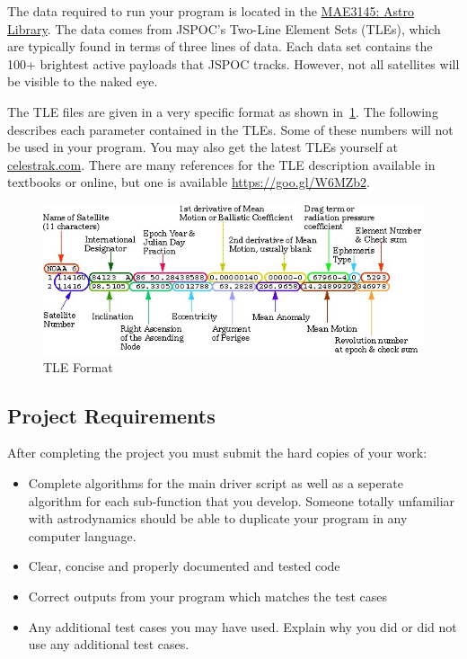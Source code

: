 \documentclass[11pt, reqno]{article}    %
\begin{document}
The data required to run your program is located in the \href{https://github.com/fdcl-gwu/MAE3145_library}{MAE3145: Astro Library}.
The data comes from JSPOC's Two-Line Element Sets (TLEs), which are typically found in terms of three lines of data.
Each data set contains the 100+ brightest active payloads that JSPOC tracks.
However, not all satellites will be visible to the naked eye.

The TLE files are given in a very specific format as shown in~\cref{fig:tle}. 
The following describes each parameter contained in the TLEs.
Some of these numbers will not be used in your program. 
You may also get the latest TLEs yourself at \href{www.clestrak.com}{celestrak.com}.
There are many references for the TLE description available in textbooks or online, but one is available \href{https://goo.gl/W6MZb2}{https://goo.gl/W6MZb2}.

\begin{figure}
    \centering
    \includegraphics[width=\textwidth, keepaspectratio]{figures/tle.jpeg}
    \caption{TLE Format\label{fig:tle}}
\end{figure}
\subsection*{Project Requirements}
After completing the project you must submit the hard copies of your work:
\begin{itemize}
    \item Complete algorithms for the main driver script as well as a seperate algorithm for each sub-function that you develop.
        Someone totally unfamiliar with astrodynamics should be able to duplicate your program in any computer language.
    \item Clear, concise and properly documented and tested code
    \item Correct outputs from your program which matches the test cases
    \item Any additional test cases you may have used. 
        Explain why you did or did not use any additional test cases.
\end{itemize}
\end{document}
